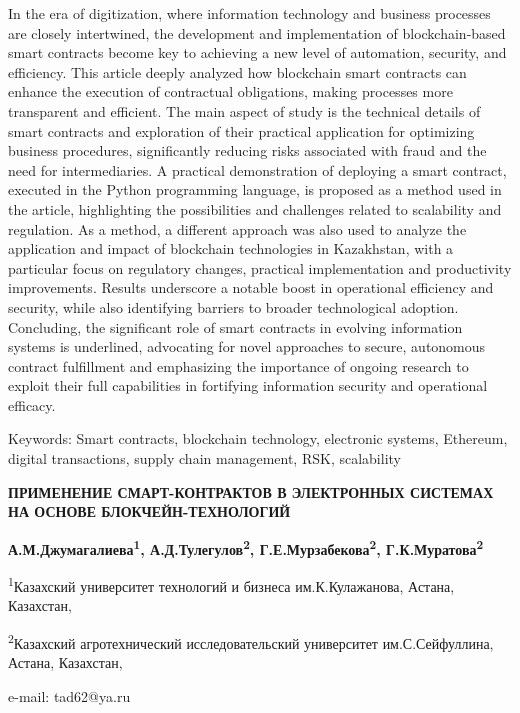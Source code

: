 In the era of digitization, where information technology and business
processes are closely intertwined, the development and implementation of
blockchain-based smart contracts become key to achieving a new level of
automation, security, and efficiency. This article deeply analyzed how
blockchain smart contracts can enhance the execution of contractual
obligations, making processes more transparent and efficient. The main
aspect of study is the technical details of smart contracts and
exploration of their practical application for optimizing business
procedures, significantly reducing risks associated with fraud and the
need for intermediaries. A practical demonstration of deploying a smart
contract, executed in the Python programming language, is proposed as a
method used in the article, highlighting the possibilities and
challenges related to scalability and regulation. As a method, a
different approach was also used to analyze the application and impact
of blockchain technologies in Kazakhstan, with a particular focus on
regulatory changes, practical implementation and productivity
improvements. Results underscore a notable boost in operational
efficiency and security, while also identifying barriers to broader
technological adoption. Concluding, the significant role of smart
contracts in evolving information systems is underlined, advocating for
novel approaches to secure, autonomous contract fulfillment and
emphasizing the importance of ongoing research to exploit their full
capabilities in fortifying information security and operational
efficacy.

Keywords: Smart contracts, blockchain technology, electronic systems,
Ethereum, digital transactions, supply chain management, RSK,
scalability

\textbf{ПРИМЕНЕНИЕ СМАРТ-КОНТРАКТОВ В ЭЛЕКТРОННЫХ СИСТЕМАХ НА ОСНОВЕ
БЛОКЧЕЙН-ТЕХНОЛОГИЙ}

\textbf{А.М.Джумагалиева\textsuperscript{1},
А.Д.Тулегулов\textsuperscript{2}, Г.Е.Мурзабекова\textsuperscript{2},
Г.К.Муратова\textsuperscript{2}}

\textsuperscript{1}Казахский университет технологий и бизнеса
им.К.Кулажанова, Астана, Казахстан,

\textsuperscript{2}Казахский агротехнический исследовательский
университет им.С.Сейфуллина, Астана, Казахстан,

e-mail: tad62@ya.ru

